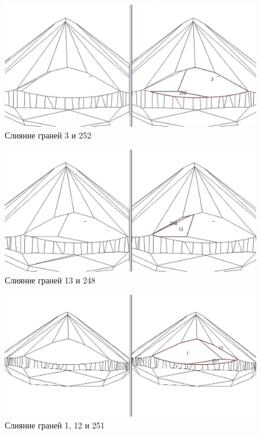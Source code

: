 \documentclass[a4paper,12pt, titlepage]{article}
\begin{document}
\begin{flushleft}
  \begin{figure}[p]
    \includegraphics[width=15cm]{polyhedron-2010-11-25/join7.jpeg}
    \caption{Слияние граней 3 и 252}\label{join7}
  \end{figure}
\end{flushleft}
\begin{flushleft}
  \begin{figure}[p]
    \includegraphics[width=15cm]{polyhedron-2010-11-25/join8.jpeg}
    \caption{Слияние граней 13 и 248}\label{join8}
  \end{figure}
\end{flushleft}
\begin{flushleft}
  \begin{figure}[p]
    \includegraphics[width=15cm]{polyhedron-2010-11-25/join9.jpeg}
    \caption{Слияние граней 1, 12 и 251}\label{join9}
  \end{figure}
\end{flushleft}
\end{document}
